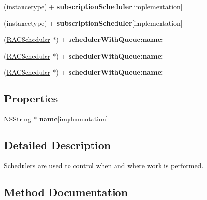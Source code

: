 \begin{DoxyCompactItemize}
(instancetype) + {\bfseries subscription\+Scheduler}{\ttfamily  \mbox{[}implementation\mbox{]}}
\item 
\mbox{\label{interface_r_a_c_scheduler_a6aea8454cf48d37f88bd2484286fda1f}} 
(instancetype) + {\bfseries subscription\+Scheduler}{\ttfamily  \mbox{[}implementation\mbox{]}}
\item 
\mbox{\label{interface_r_a_c_scheduler_a106be2765ef5f6b5738f5d84808d7f7c}} 
(\mbox{\hyperlink{interface_r_a_c_scheduler}{R\+A\+C\+Scheduler}} $\ast$) + {\bfseries scheduler\+With\+Queue\+:name\+:}
\item 
\mbox{\label{interface_r_a_c_scheduler_a106be2765ef5f6b5738f5d84808d7f7c}} 
(\mbox{\hyperlink{interface_r_a_c_scheduler}{R\+A\+C\+Scheduler}} $\ast$) + {\bfseries scheduler\+With\+Queue\+:name\+:}
\item 
\mbox{\label{interface_r_a_c_scheduler_a106be2765ef5f6b5738f5d84808d7f7c}} 
(\mbox{\hyperlink{interface_r_a_c_scheduler}{R\+A\+C\+Scheduler}} $\ast$) + {\bfseries scheduler\+With\+Queue\+:name\+:}
\end{DoxyCompactItemize}
\subsection*{Properties}
\begin{DoxyCompactItemize}
\item 
\mbox{\label{interface_r_a_c_scheduler_a922b5b26c1835d9e529530d8fdf3848a}} 
N\+S\+String $\ast$ {\bfseries name}{\ttfamily  \mbox{[}implementation\mbox{]}}
\end{DoxyCompactItemize}


\subsection{Detailed Description}
Schedulers are used to control when and where work is performed. 

\subsection{Method Documentation}
\mbox{\label{interface_r_a_c_scheduler_ae0e70791e20c43df48d62eedbfa236ba}} 
